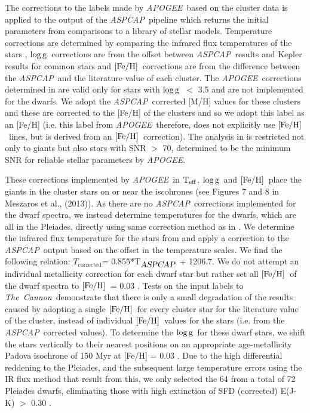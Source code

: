\documentclass[12pt, preprint]{aastex}
\newcommand{\teff}{\mbox{$\rm T_{eff}$}}
\newcommand{\feh}{\mbox{$\rm [Fe/H]$}}
\newcommand{\logg}{\mbox{$\rm \log g$}}
\newcommand{\tc}{\textsl{The~Cannon}}
\newcommand{\apogee}{\textsl{APOGEE}}
\newcommand{\aspcap}{\textsl{ASPCAP}}
\begin{document}
The corrections to the labels made by \apogee\ based on the cluster data is applied to the output of the \aspcap\ pipeline which returns the initial parameters from comparisons to a library of stellar models. Temperature corrections are determined by comparing the infrared flux temperatures of the stars \citep{gonzalez2009}, \logg\ corrections are from the offset between \aspcap\ results and Kepler results for common stars and \feh\ corrections are from the difference between the \aspcap\ and  the literature value of each cluster.  The \apogee\ corrections determined in \citet{Meszaros2013} are valid only for stars with \logg\ $<$ 3.5 and are not implemented for the dwarfs.  We adopt the \aspcap\ corrected [M/H] values for these clusters and these are corrected to the [Fe/H] of the clusters and so we adopt this label as an [Fe/H] (i.e. this label from \apogee\ therefore, does not explicitly use \feh\ lines, but is derived from an \feh\ correction). The analysis in \citet{Meszaros2013} is restricted not only to giants but also stars with SNR $>$ 70, determined to be the minimum SNR for reliable stellar parameters by \apogee.

These corrections implemented by \apogee\ in \teff, \logg\ and  \feh\ place the giants in the cluster stars on or near the iscohrones (see Figures 7 and 8 in Meszaros et al., (2013)).  As there are no \aspcap\ corrections implemented for the dwarf spectra, we instead determine temperatures for the dwarfs, which are all in the Pleiades, directly using same correction method as in \citet{Meszaros2013}. We determine the infrared flux temperature for the stars from \citet{gonzalez2009} and apply a correction to the \aspcap\ output based on the offset in the temperature scales. We find the following relation: $T_{\mbox{corrected}}$= 0.855*T$_{\mbox{\textit{\aspcap}}}$ + 1206.7. We do not attempt an individual metallicity correction for each dwarf star but rather set all \feh\ of the dwarf spectra to \feh\ = 0.03 \citep{barrado2001}. Tests on the input labels to \tc\ demonstrate that there is only a small degradation of the results caused by adopting a single \feh\ for every cluster star for the literature value of the cluster, instead of individual \feh\ values for the stars (i.e. from the \aspcap\ corrected values). To determine the \logg\ for these dwarf stars, we shift the stars vertically to their nearest positions on an appropriate age-metallicity Padova isochrone of 150 Myr at [Fe/H] = 0.03 \citep{girardi2000}. Due to the high differential reddening to the Pleiades, and the subsequent large temperature errors using the IR flux method that result from this, we only selected the 64 from a total of 72 Pleiades dwarfs, eliminating those with high extinction of SFD (corrected) E(J-K) $>$ 0.30 \citep{Schlafly2011}.
\end{document}
